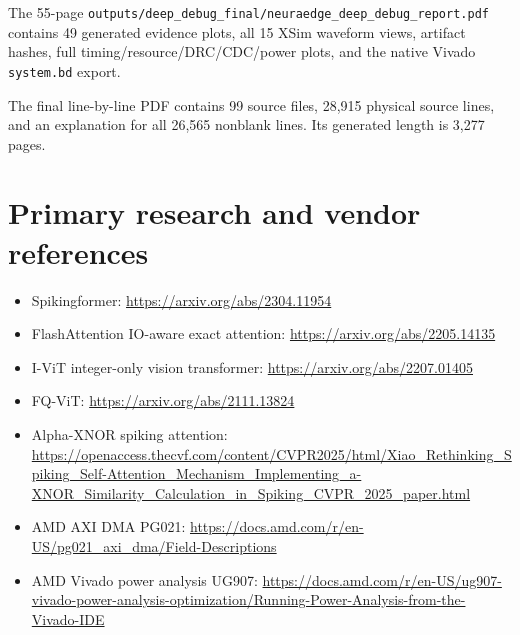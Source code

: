 \documentclass[10pt]{article}
\begin{document}
The 55-page
\texttt{outputs/deep\_debug\_final/neuraedge\_deep\_debug\_report.pdf}
contains 49 generated evidence plots, all 15 XSim waveform views, artifact
hashes, full timing/resource/DRC/CDC/power plots, and the native Vivado
\texttt{system.bd} export.

The final line-by-line PDF contains 99 source files, 28,915 physical source
lines, and an explanation for all 26,565 nonblank lines. Its generated length
is 3,277 pages.

\section{Primary research and vendor references}

\begin{sloppypar}
\begin{itemize}
  \item Spikingformer: \url{https://arxiv.org/abs/2304.11954}
  \item FlashAttention IO-aware exact attention: \url{https://arxiv.org/abs/2205.14135}
  \item I-ViT integer-only vision transformer: \url{https://arxiv.org/abs/2207.01405}
  \item FQ-ViT: \url{https://arxiv.org/abs/2111.13824}
  \item Alpha-XNOR spiking attention: \url{https://openaccess.thecvf.com/content/CVPR2025/html/Xiao_Rethinking_Spiking_Self-Attention_Mechanism_Implementing_a-XNOR_Similarity_Calculation_in_Spiking_CVPR_2025_paper.html}
  \item AMD AXI DMA PG021: \url{https://docs.amd.com/r/en-US/pg021_axi_dma/Field-Descriptions}
  \item AMD Vivado power analysis UG907: \url{https://docs.amd.com/r/en-US/ug907-vivado-power-analysis-optimization/Running-Power-Analysis-from-the-Vivado-IDE}
\end{itemize}
\end{sloppypar}
\end{document}
